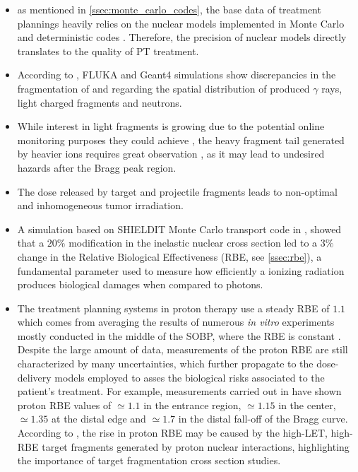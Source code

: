 \begin{itemize}
	\item as mentioned in \autoref{ssec:monte_carlo_codes}, the base data of treatment plannings heavily relies on the nuclear models implemented in Monte Carlo \cite{Parodi_2012,10.3389/fonc.2016.00116} and deterministic codes \cite{articleTreatmentPlanningKrämer,Haettner_2013}. Therefore, the precision of nuclear models directly translates to the quality of PT treatment.
	\item According to \cite{Robert_2013}, FLUKA and Geant4 simulations show discrepancies in the fragmentation of  and  regarding the spatial distribution of produced $\gamma$ rays, light charged fragments and neutrons.
	\item While interest in light fragments is growing due to the potential online monitoring purposes they could achieve \cite{Piersanti_2014}, the heavy fragment tail generated by heavier ions requires great observation \cite{Kase_2006}, as it may lead to undesired hazards after the Bragg peak region.
	\item The dose released by target \cite{Kodaira2019-of} and projectile \cite{impactOfModelingNuclearFragmentation} fragments leads to non-optimal and inhomogeneous tumor irradiation.
	\item A simulation based on SHIELDIT Monte Carlo transport code in \cite{impactOfModelingNuclearFragmentation}, showed that a $20\%$ modification in the inelastic nuclear cross section led to a $3\%$ change in the Relative Biological Effectiveness (RBE, see \autoref{ssec:rbe}), a fundamental parameter used to measure how efficiently a ionizing radiation produces biological damages when compared to photons.
	\item The treatment planning systems in proton therapy use a steady RBE of $1.1$ which comes from averaging the results of numerous \textit{in vitro} experiments mostly conducted in the middle of the SOBP, where the RBE is constant \cite{Ilicic2018-xf}. Despite the large amount of data, measurements of the proton RBE are still characterized by many uncertainties, which further propagate to the dose-delivery models employed to asses the biological risks associated to the patient's treatment. For example, measurements carried out in \cite{Paganetti_2014} have shown proton RBE values of $\simeq1.1$ in the entrance region, $\simeq1.15$ in the center, $\simeq1.35$ at the distal edge and $\simeq1.7$ in the distal fall-off of the Bragg curve. According to \cite{Pfuhl_2018,Bellinzona2021-bg}, the rise in proton RBE may be caused by the high-LET, high-RBE target fragments generated by proton nuclear interactions, highlighting the importance of target fragmentation cross section studies.

\end{itemize}
